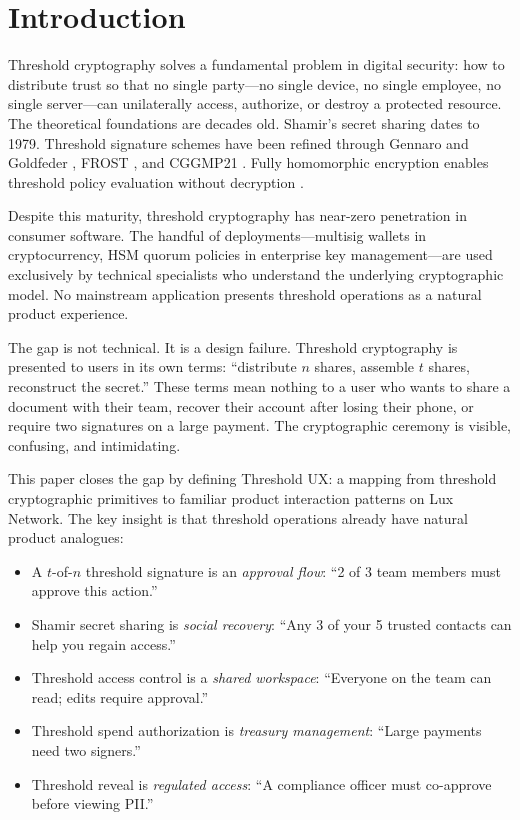 \section{Introduction}
\label{sec:intro}

Threshold cryptography solves a fundamental problem in digital security: how
to distribute trust so that no single party---no single device, no single
employee, no single server---can unilaterally access, authorize, or destroy
a protected resource. The theoretical foundations are decades old. Shamir's
secret sharing \cite{shamir1979share} dates to 1979. Threshold signature
schemes have been refined through Gennaro and Goldfeder \cite{gennaro2018fast},
FROST \cite{komlo2020frost}, and CGGMP21 \cite{canetti2021cggmp}. Fully
homomorphic encryption enables threshold policy evaluation without
decryption \cite{gentry2009fhe}.

Despite this maturity, threshold cryptography has near-zero penetration in
consumer software. The handful of deployments---multisig wallets in
cryptocurrency, HSM quorum policies in enterprise key management---are
used exclusively by technical specialists who understand the underlying
cryptographic model. No mainstream application presents threshold
operations as a natural product experience.

The gap is not technical. It is a design failure. Threshold cryptography
is presented to users in its own terms: ``distribute $n$ shares, assemble
$t$ shares, reconstruct the secret.'' These terms mean nothing to a user
who wants to share a document with their team, recover their account after
losing their phone, or require two signatures on a large payment. The
cryptographic ceremony is visible, confusing, and intimidating.

This paper closes the gap by defining Threshold UX: a mapping from
threshold cryptographic primitives to familiar product interaction patterns
on Lux Network. The key insight is that threshold operations already have
natural product analogues:

\begin{itemize}
    \item A $t$-of-$n$ threshold signature is an \emph{approval flow}: ``2 of 3 team members must approve this action.''
    \item Shamir secret sharing is \emph{social recovery}: ``Any 3 of your 5 trusted contacts can help you regain access.''
    \item Threshold access control is a \emph{shared workspace}: ``Everyone on the team can read; edits require approval.''
    \item Threshold spend authorization is \emph{treasury management}: ``Large payments need two signers.''
    \item Threshold reveal is \emph{regulated access}: ``A compliance officer must co-approve before viewing PII.''
\end{itemize}

